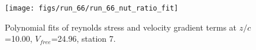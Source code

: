 \begin{figure}[H]
\centering
\texttt{[image: figs/run\_66/run\_66\_nut\_ratio\_fit]}
\caption{Polynomial fits of reynolds stress and velocity gradient terms at $z/c$=10.00, $V_{free}$=24.96, station 7.}
\label{fig:run_66_nut_ratio_fit}
\end{figure}


